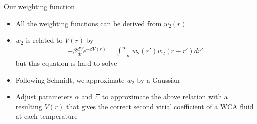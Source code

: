 \documentclass{beamer}
\renewcommand{\vec}[1]{\mathbf{#1}}
\begin{document}
\begin{frame}{Our weighting function}
    \begin{itemize}
        \item All the weighting functions can be derived from $w_2(r)$
        \item $w_2$ is related to $V(r)$ by
        \begin{align}
          -\beta \frac{dV}{dr}e^{-\beta V(r)}
             = \int_{-\infty}^{\infty}w_2(r')w_2(r-r')dr'
      \end{align}
      but this equation is hard to solve
      \item Following Schmidt, we approximate $w_2$ by a Gaussian
      \item Adjust parameters $\alpha$ and $\Xi$ to approximate the above relation with a resulting $V(r)$
that gives the correct second virial coefficient of a WCA fluid at each temperature
    \end{itemize}

\end{frame}
\end{document}
